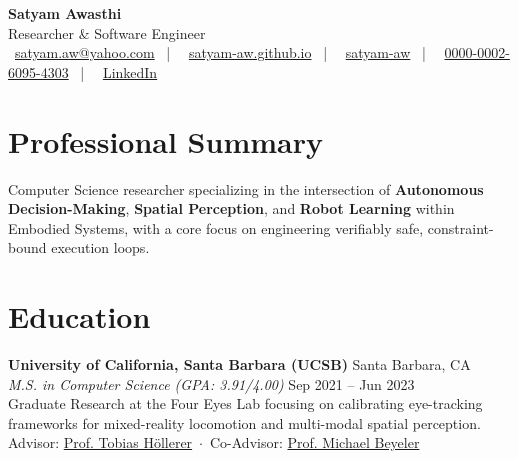 \documentclass[10pt,letterpaper]{article}
\begin{document}

\begin{center}
    {\LARGE\bfseries\color{primary} Satyam Awasthi} \\ \vspace{0.3em}
    {\color{secondary} Researcher \& Software Engineer} \\ \vspace{0.4em}
    \small 
    \faEnvelope~\href{mailto:satyam.aw@yahoo.com}{satyam.aw@yahoo.com} \ | \ 
    \faGlobe~\href{https://satyam-aw.github.io}{satyam-aw.github.io} \ | \ 
    \faGithub~\href{https://github.com/satyam-aw}{satyam-aw} \ | \ 
    \faOrcid~\href{https://orcid.org/0000-0002-6095-4303}{0000-0002-6095-4303} \ | \ 
    \faLinkedin~\href{https://linkedin.com/in/satyam-awasthi}{LinkedIn}  \\ \vspace{6pt}
\end{center}


\vspace{0.5em}

\section*{Professional Summary}
Computer Science researcher specializing in the intersection of \textbf{Autonomous Decision-Making}, \textbf{Spatial Perception}, and \textbf{Robot Learning} within Embodied Systems, with a core focus on engineering verifiably safe, constraint-bound execution loops.

\section*{Education}
\noindent
\textbf{University of California, Santa Barbara (UCSB)} \hfill Santa Barbara, CA \\
\textit{M.S. in Computer Science (GPA: 3.91/4.00)} \hfill Sep 2021 – Jun 2023 \\
Graduate Research at the Four Eyes Lab focusing on calibrating eye-tracking frameworks for mixed-reality locomotion and multi-modal spatial perception. \\
Advisor: \href{https://scholar.google.com/citations?user=008lr2cAAAAJ&hl=en}{\color{accent}Prof. Tobias Höllerer} \,$\cdot$\, Co-Advisor: \href{https://scholar.google.com/citations?user=dK-0kG4AAAAJ&hl=en}{\color{accent}Prof. Michael Beyeler} \\
\end{document}
